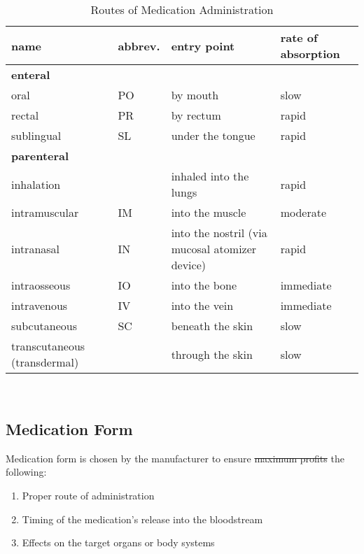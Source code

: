 \documentclass[../../EMT-169.tex]{subfiles}
\begin{document}
\begin{table}[ht]
	\centering
	\caption{Routes of Medication Administration}
	
	\bgroup
	\def\arraystretch{1.25}%
	\begin{tabular}{|p{3cm}|p{1.5cm}|p{5cm}|p{4cm}|}
		\hline
		\textbf{name} 			& \textbf{abbrev.} 	& \textbf{entry point}			& \textbf{rate of absorption} \\ \hline \hline
		
		\multicolumn{4}{l}{\bfseries enteral} \\ \hline
		[per] oral				& PO				& by mouth						& slow \\ \hline 
		[per] rectal			& PR				& by rectum						& rapid \\ \hline
		sublingual 				& SL 				& under the tongue				& rapid \\ \hline
		
		\multicolumn{4}{l}{\bfseries parenteral} \\ \hline
		inhalation	 			& 					& inhaled into the lungs		& rapid \\ \hline
		intramuscular 			& IM				& into the muscle 				& moderate \\ \hline
		intranasal				& IN  				& into the nostril \newline	(via mucosal atomizer device)	
																					& rapid \\ \hline
		intraosseous 			& IO 				& into the bone					& immediate \\ \hline
		intravenous 			& IV 				& into the vein 				& immediate \\ \hline
		subcutaneous 			& SC 				& beneath the skin				& slow \\ \hline
		transcutaneous 
		\newline
		(transdermal)			&   				& through the skin  			& slow \\ \hline
	\end{tabular}
	\egroup
\end{table}\hfill \\

\pagebreak
\subsection{Medication Form}
Medication form is chosen by the manufacturer to ensure \sout{maximum profits} the following:
\begin{enumerate}
	\item Proper route of administration
	\item Timing of the medication’s release into the bloodstream
	\item Effects on the target organs or body systems
\end{enumerate}
\end{document}
